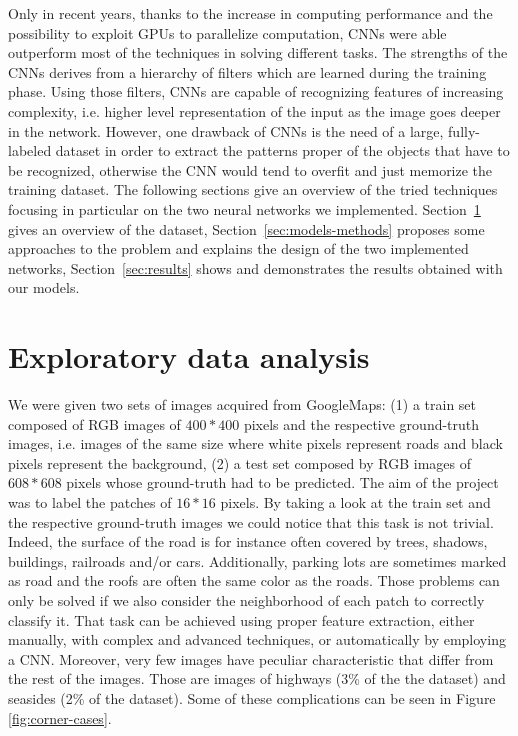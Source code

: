 \documentclass[10pt,conference,compsocconf]{IEEEtran}
\begin{document}
Only in recent years, thanks to the increase in computing performance and the possibility to exploit GPUs to parallelize computation, CNNs were able outperform most of the techniques in solving different tasks. The strengths of the CNNs derives from a hierarchy of filters which are learned during the training phase. Using those filters, CNNs are capable of recognizing features of increasing complexity, i.e. higher level representation of the input as the image goes deeper in the network. However, one drawback of CNNs is the need of a large, fully-labeled dataset in order to extract the patterns proper of the objects that have to be recognized, otherwise the CNN would tend to overfit and just memorize the training dataset.
The following sections give an overview of the tried techniques focusing in particular on the two neural networks we implemented. Section~\ref{sec:data-analysis} gives an overview of the dataset, Section~\ref{sec:models-methods} proposes some approaches to the problem and explains the design of the two implemented networks, Section~\ref{sec:results} shows and demonstrates the results obtained with our models.

\section{Exploratory data analysis}
\label{sec:data-analysis}
We were given two sets of images acquired from GoogleMaps: (1) a train set composed of RGB images of $400*400$ pixels and the respective ground-truth images, i.e. images of the same size where white pixels represent roads and black pixels represent the background, (2) a test set composed by RGB images of $608*608$ pixels whose ground-truth had to be predicted.
The aim of the project was to label the patches of $16*16$ pixels. By taking a look at the train set and the respective ground-truth images we could notice that this task is not trivial. Indeed, the surface of the road is for instance often covered by trees, shadows, buildings, railroads and/or cars. Additionally, parking lots are sometimes marked as road and the roofs are often the same color as the roads. Those problems can only be solved if we also consider the neighborhood of each patch to correctly classify it. That task can be achieved using proper feature extraction, either manually, with complex and advanced techniques, or automatically by employing a CNN. Moreover, very few images have peculiar characteristic that differ from the rest of the images. Those are images of highways (3\% of the the dataset) and seasides (2\% of the dataset). Some of these complications can be seen in Figure \ref{fig:corner-cases}.
\end{document}
